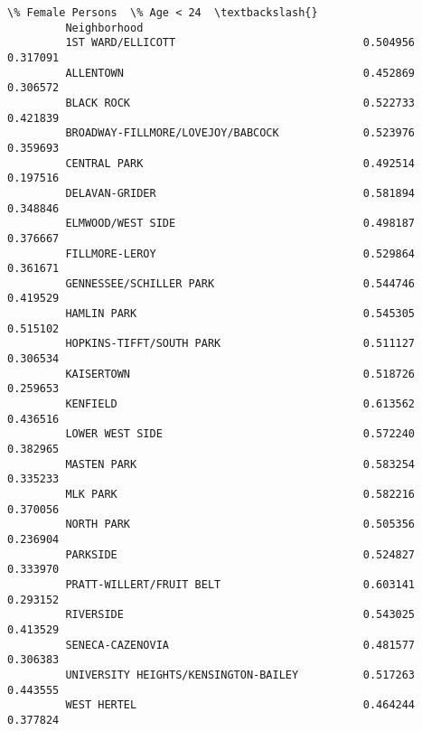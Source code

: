 \documentclass[11pt]{article}
\begin{document}
\begin{Verbatim}[commandchars=\\\{\}]
                                               \% Female Persons  \% Age < 24  \textbackslash{}
         Neighborhood                                                         
         1ST WARD/ELLICOTT                             0.504956    0.317091   
         ALLENTOWN                                     0.452869    0.306572   
         BLACK ROCK                                    0.522733    0.421839   
         BROADWAY-FILLMORE/LOVEJOY/BABCOCK             0.523976    0.359693   
         CENTRAL PARK                                  0.492514    0.197516   
         DELAVAN-GRIDER                                0.581894    0.348846   
         ELMWOOD/WEST SIDE                             0.498187    0.376667   
         FILLMORE-LEROY                                0.529864    0.361671   
         GENNESSEE/SCHILLER PARK                       0.544746    0.419529   
         HAMLIN PARK                                   0.545305    0.515102   
         HOPKINS-TIFFT/SOUTH PARK                      0.511127    0.306534   
         KAISERTOWN                                    0.518726    0.259653   
         KENFIELD                                      0.613562    0.436516   
         LOWER WEST SIDE                               0.572240    0.382965   
         MASTEN PARK                                   0.583254    0.335233   
         MLK PARK                                      0.582216    0.370056   
         NORTH PARK                                    0.505356    0.236904   
         PARKSIDE                                      0.524827    0.333970   
         PRATT-WILLERT/FRUIT BELT                      0.603141    0.293152   
         RIVERSIDE                                     0.543025    0.413529   
         SENECA-CAZENOVIA                              0.481577    0.306383   
         UNIVERSITY HEIGHTS/KENSINGTON-BAILEY          0.517263    0.443555   
         WEST HERTEL                                   0.464244    0.377824   
         

\end{Verbatim}
\end{document}
